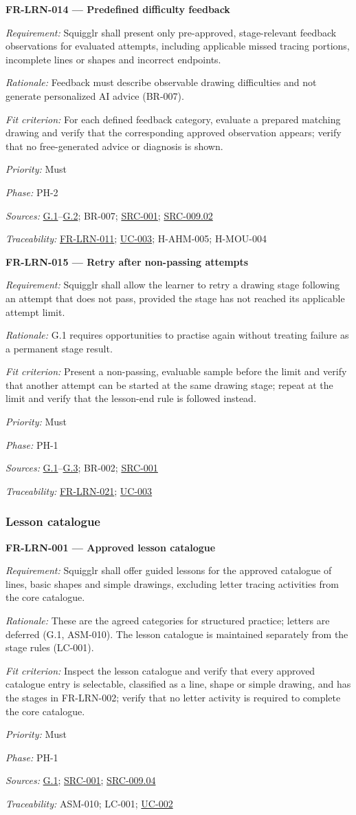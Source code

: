 \documentclass[12pt]{article}
\renewcommand{\_}{\textunderscore\allowbreak}%
\newcommand{\goalref}[1]{\hyperref[goal:#1]{G.#1}}
\newcommand{\ucref}[1]{\hyperref[uc:#1]{\mbox{UC-#1}}}
\newenvironment{srsrequirement}[2]{%
  \par\medskip\noindent\phantomsection\label{req:#1}%
  \textbf{#1 --- #2}\par\nobreak\smallskip }{\par\medskip}
\newcommand{\reqfield}[2]{\noindent\textit{#1:} #2\par}
\newcommand{\reqshall}[1]{\reqfield{Requirement}{#1}}
\newcommand{\reqrationale}[1]{\reqfield{Rationale}{#1}}
\newcommand{\reqfit}[1]{\reqfield{Fit criterion}{#1}}
\newcommand{\reqpriority}[1]{\reqfield{Priority}{#1}}
\newcommand{\reqphase}[1]{\reqfield{Phase}{#1}}
\newcommand{\reqsources}[1]{\reqfield{Sources}{#1}}
\newcommand{\reqtraces}[1]{\reqfield{Traceability}{#1}}
\newcommand{\reqref}[1]{\hyperref[req:#1]{#1}}
\newcommand{\srcref}[1]{\hyperref[src:#1]{SRC-#1}}
\providecommand{\ucref}[1]{\hyperref[uc:#1]{UC-#1}}
\begin{document}
\begin{srsrequirement}{FR-LRN-014}{Predefined difficulty feedback}
  \reqshall{Squigglr shall present only pre-approved, stage-relevant feedback
observations for evaluated attempts, including applicable missed tracing
portions, incomplete lines or shapes and incorrect endpoints.}
\reqrationale{Feedback must describe observable drawing difficulties and not
generate personalized AI advice (BR-007).} \reqfit{For each defined feedback
category, evaluate a prepared matching drawing and verify that the corresponding
approved observation appears; verify that no free-generated advice or diagnosis
is shown.}
  \reqpriority{Must}
  \reqphase{PH-2}
  \reqsources{\goalref{1}--\goalref{2}; BR-007; \srcref{001};
  \hyperref[src:009.02]{SRC-009.02}} \reqtraces{\reqref{FR-LRN-011};
  \ucref{003}; H-AHM-005; H-MOU-004}
\end{srsrequirement}

\begin{srsrequirement}{FR-LRN-015}{Retry after non-passing attempts}
  \reqshall{Squigglr shall allow the learner to retry a drawing stage following
an attempt that does not pass, provided the stage has not reached its applicable
attempt limit.} \reqrationale{G.1 requires opportunities to practise again
without treating failure as a permanent stage result.} \reqfit{Present a
non-passing, evaluable sample before the limit and verify that another attempt
can be started at the same drawing stage; repeat at the limit and verify that
the lesson-end rule is followed instead.}
  \reqpriority{Must}
  \reqphase{PH-1}
  \reqsources{\goalref{1}--\goalref{3}; BR-002; \srcref{001}}
  \reqtraces{\reqref{FR-LRN-021}; \ucref{003}}
\end{srsrequirement}

\subsubsection{Lesson catalogue}
\begin{srsrequirement}{FR-LRN-001}{Approved lesson catalogue}
  \reqshall{Squigglr shall offer guided lessons for the approved catalogue of
lines, basic shapes and simple drawings, excluding letter tracing activities
from the core catalogue.} \reqrationale{These are the agreed categories for
structured practice; letters are deferred (G.1, ASM-010). The lesson catalogue
is maintained separately from the stage rules (LC-001).} \reqfit{Inspect the
lesson catalogue and verify that every approved catalogue entry is selectable,
classified as a line, shape or simple drawing, and has the stages in FR-LRN-002;
verify that no letter activity is required to complete the core catalogue.}
  \reqpriority{Must}
  \reqphase{PH-1}
  \reqsources{\goalref{1}; \srcref{001}; \hyperref[src:009.04]{SRC-009.04}}
  \reqtraces{ASM-010; LC-001; \ucref{002}}
\end{srsrequirement}
\end{document}

